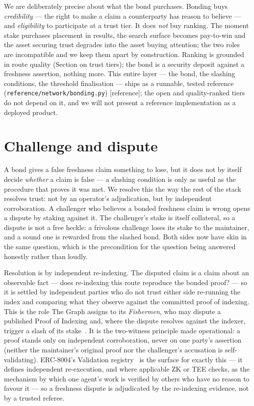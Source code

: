 \documentclass[11pt]{article}
\newcommand{\refimpl}{\textcolor{blue!70!black}{\small[reference]}}
\begin{document}
We are deliberately precise about what the bond purchases. Bonding buys
\emph{credibility} --- the right to make a claim a counterparty has reason to
believe --- and \emph{eligibility} to participate at a trust tier. It does
\emph{not} buy ranking. The moment stake purchases placement in results, the search
surface becomes pay-to-win and the asset securing trust degrades into the asset
buying attention; the two roles are incompatible and we keep them apart by
construction. Ranking is grounded in route quality (Section on trust tiers); the
bond is a security deposit against a freshness assertion, nothing more. This entire
layer --- the bond, the slashing conditions, the threshold finalisation --- ships as
a runnable, tested reference (\texttt{reference/network/bonding.py}) \refimpl{}; the
open and quality-ranked tiers do not depend on it, and we will not present a
reference implementation as a deployed product.

\section{Challenge and dispute}

A bond gives a false freshness claim something to lose, but it does not by itself
decide \emph{whether} a claim is false --- a slashing condition is only as useful
as the procedure that proves it was met. We resolve this the way the rest of the
stack resolves trust: not by an operator's adjudication, but by independent
corroboration. A challenger who believes a bonded freshness claim is wrong opens a
dispute by staking against it. The challenger's stake is itself collateral, so a
dispute is not a free heckle: a frivolous challenge loses its stake to the
maintainer, and a sound one is rewarded from the slashed bond. Both sides now have
skin in the same question, which is the precondition for the question being
answered honestly rather than loudly.

Resolution is by independent re-indexing. The disputed claim is a claim about an
observable fact --- does re-indexing this route reproduce the bonded proof? --- so
it is settled by independent parties who do not trust either side re-running the
index and comparing what they observe against the committed proof of indexing. This
is the role The Graph assigns to its \emph{Fishermen}, who may dispute a published
Proof of Indexing and, where the dispute resolves against the indexer, trigger a
slash of its stake~\cite{thegraph}. It is the two-witness principle made
operational: a proof stands only on independent corroboration, never on one party's
assertion (neither the maintainer's original proof nor the challenger's accusation
is self-validating). ERC-8004's Validation registry~\cite{erc8004} is the surface
for exactly this --- it defines independent re-execution, and where applicable ZK or
TEE checks, as the mechanism by which one agent's work is verified by others who
have no reason to favour it --- so a freshness dispute is adjudicated by the
re-indexing evidence, not by a trusted referee.
\end{document}

